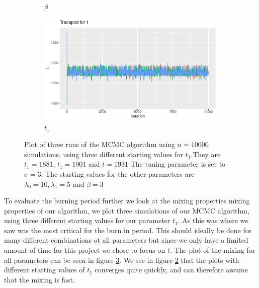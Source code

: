 \begin{figure}[H]
\begin{subfigure}[b]{0.49\textwidth}
        \caption{$\beta$ }
        \label{fig:sim_mixing_beta}
    \end{subfigure}
    \begin{subfigure}[b]{0.49\textwidth}
        \centering
        \includegraphics[width = \textwidth]{Images/mixing_t.pdf}
        \caption{$t_1$}
        \label{fig:sim_mixing_t}
    \end{subfigure}
    \caption{Plot of three runs of the MCMC algorithm using $n = 10000$ simulations, using three different starting values for $t_1$.They are $t_1 = 1881$, $t_1 = 1901$ and $t = 1931$ The tuning parameter is set to $\sigma = 3$. The starting values for the other parameters are $\lambda_0 = 10, \lambda_1 = 5$ and $\beta = 3$}
    \label{fig:sim_mixing}
\end{figure}





To evaluate the burning period further we look at the mixing properties mixing properties of our algorithm, we plot three simulations of our MCMC algorithm, using three different starting values for our parameter $t_1$. As this was where we saw was the most critical for the burn in period. This should ideally be done for many different combinations ot all parameters but since we only have a limited amount of time for this project we chose to focus on $t$. The plot of the mixing for all parameters can be seen in figure \ref{fig:sim_mixing}. We see in figure \ref{fig:sim_mixing_t} that the plots with different starting values of $t_1$ converges quite quickly, and can therefore assume that the mixing is fast. 

